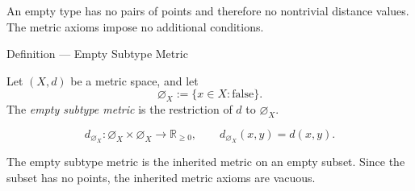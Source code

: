 \begin{remark*}[Interpretation]
An empty type has no pairs of points and therefore no nontrivial distance
values.  The metric axioms impose no additional conditions.
\end{remark*}


\DefinitionalRoot

\begin{definitionbox}{Definition --- Empty Subtype Metric}
\begin{definition}\label{def:empty-subtype-metric}
Let \((X,d)\) be a metric space, and let
\[
  \varnothing_X:=\{x\in X : \text{false}\}.
\]
The \emph{empty subtype metric} is the restriction of \(d\) to
\(\varnothing_X\).
\end{definition}
\end{definitionbox}

\begin{remark*}
\[
d_{\varnothing_X}:
\varnothing_X\times\varnothing_X\to\mathbb{R}_{\geq 0},
\qquad
d_{\varnothing_X}(x,y)=d(x,y).
\]
\end{remark*}

\begin{remark*}[Interpretation]
The empty subtype metric is the inherited metric on an empty subset.  Since
the subset has no points, the inherited metric axioms are vacuous.
\end{remark*}


\DefinitionalRoot
